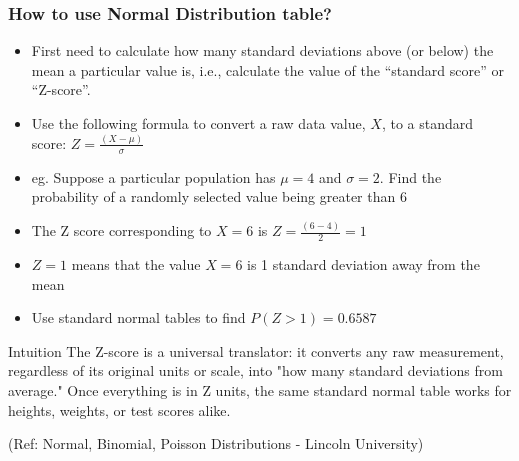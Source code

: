\begin{frame}
\frametitle{How to use Normal Distribution table?}

\begin{itemize}
\item First need to calculate how many standard deviations above (or below) the mean a
particular value is, i.e., calculate the value of the ``standard score'' or ``Z-score''.
\item Use the following formula to convert a raw data value, $X$, to a standard score:
$Z = \frac{(X - \mu)}{\sigma}$
\item eg. Suppose a particular population has $\mu= 4$ and $\sigma = 2$. Find the probability of a
randomly selected value being greater than 6
\item The Z score corresponding to $X = 6$ is $Z = \frac{(6 - 4)}{2} = 1$
\item $Z=1$ means that the value $X = 6$ is 1 standard deviation away from the mean
\item Use  standard normal tables to find $P(Z>1) = 0.6587$
\end{itemize}

\begin{block}{Intuition}
The Z-score is a universal translator: it converts any raw measurement, regardless of its original units or scale, into "how many standard deviations from average." Once everything is in Z units, the same standard normal table works for heights, weights, or test scores alike.
\end{block}


{\tiny (Ref: Normal, Binomial, Poisson Distributions -  Lincoln University)}
\end{frame}


